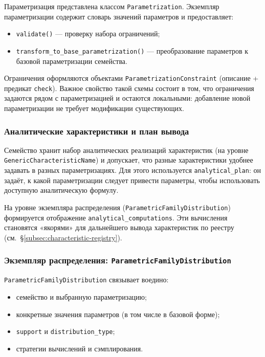 Параметризация представлена классом \texttt{Parametrization}. Экземпляр параметризации содержит словарь значений параметров и предоставляет:
\begin{itemize}[compact]
    \item \texttt{validate()} --- проверку набора ограничений;
    \item \texttt{transform\_to\_base\_parametrization()} --- преобразование параметров к базовой параметризации семейства.
\end{itemize}

Ограничения оформляются объектами \texttt{ParametrizationConstraint} (описание + предикат \texttt{check}). Важное свойство такой схемы состоит в том, что ограничения задаются рядом с параметризацией и остаются локальными: добавление новой параметризации не требует модификации существующих.

\subsubsection{Аналитические характеристики и план вывода}

Семейство хранит набор аналитических реализаций характеристик (на уровне \texttt{GenericCharacteristicName}) и допускает, что разные характеристики удобнее задавать в разных параметризациях. Для этого используется \texttt{analytical\_plan}: он задаёт, к какой параметризации следует привести параметры, чтобы использовать доступную аналитическую формулу.

На уровне экземпляра распределения (\texttt{ParametricFamilyDistribution}) формируется отображение \texttt{analytical\_computations}. Эти вычисления становятся «якорями» для дальнейшего вывода характеристик по реестру (см.~\S\ref{subsec:characteristic-registry}).

\subsubsection{Экземпляр распределения: \texttt{ParametricFamilyDistribution}}

\texttt{ParametricFamilyDistribution} связывает воедино:
\begin{itemize}[compact]
    \item семейство и выбранную параметризацию;
    \item конкретные значения параметров (в том числе в базовой форме);
    \item \texttt{support} и \texttt{distribution\_type};
    \item стратегии вычислений и сэмплирования.
\end{itemize}

